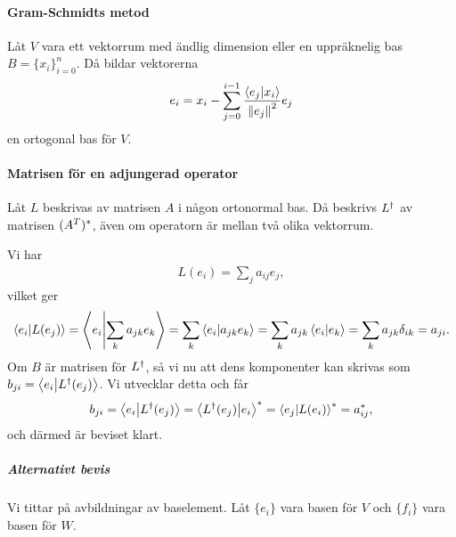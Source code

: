 \proof

\paragraph{Gram-Schmidts metod}
Låt $V$ vara ett vektorrum med ändlig dimension eller en uppräknelig bas $B = \{x_{i}\}_{i= 0}^{n}$. Då bildar vektorerna
\begin{align*}
	e_{i} = x_{i} - \sum\limits_{j = 0}^{i - 1}\frac{\bra{e_{j}}\ket{x_{i}}}{\norm{e_{j}}^{2}}e_{j}
\end{align*}
en ortogonal bas för $V$.

\proof

\paragraph{Matrisen för en adjungerad operator}
Låt $L$ beskrivas av matrisen $A$ i någon ortonormal bas. Då beskrivs $L^{\dagger}$ av matrisen $(A^{T})^{*}$, även om operatorn är mellan två olika vektorrum.

\proof
Vi har
\begin{align*}
	L(e_{i}) = \sum\limits_{j}a_{ij}e_{j},
\end{align*}
vilket ger
\begin{align*}
	\bra{e_{i}}\ket{L(e_{j})} = \bra{e_{i}}\ket{\sum\limits_{k}a_{jk}e_{k}} = \sum\limits_{k}\bra{e_{i}}\ket{a_{jk}e_{k}} = \sum\limits_{k}a_{jk}\bra{e_{i}}\ket{e_{k}} = \sum\limits_{k}a_{jk}\delta_{ik} = a_{ji}.
\end{align*}
Om $B$ är matrisen för $L^{\dagger}$, så vi nu att dens komponenter kan skrivas som $b_{ji} = \bra{e_{i}}\ket{L^{\dagger}(e_{j})}$. Vi utvecklar detta och får
\begin{align*}
	b_{ji} = \bra{e_{i}}\ket{L^{\dagger}(e_{j})} = \bra{L^{\dagger}(e_{j})}\ket{e_{i}}^{*} = \bra{e_{j}}\ket{L(e_{i})}^{*} = a_{ij}^{*},
\end{align*}
och därmed är beviset klart.

\subparagraph{Alternativt bevis}
Vi tittar på avbildningar av baselement. Låt $\{e_{i}\}$ vara basen för $V$ och $\{f_{i}\}$ vara basen för $W$.

